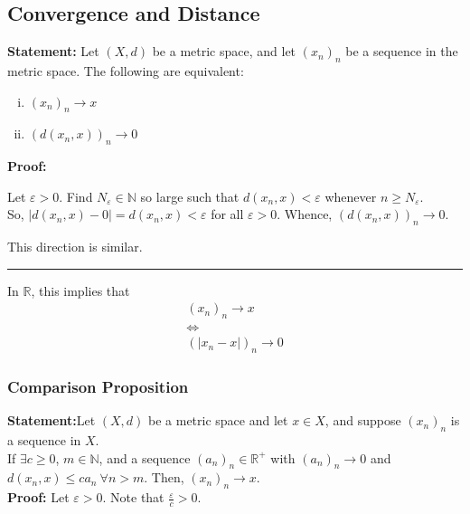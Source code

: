 \documentclass[10pt]{extarticle}
\newcommand{\N}{\mathbb{N}}
\newcommand{\R}{\mathbb{R}}
\begin{document}
    \subsection{Convergence and Distance}%
    \textbf{Statement:} Let $(X,d)$ be a metric space, and let $(x_n)_n$ be a sequence in the metric space. The following are equivalent:
      \begin{enumerate}[(i)]
        \item $(x_n)_n\rightarrow x$
        \item $\left(d(x_n,x)\right)_n \rightarrow 0$
      \end{enumerate}
      \textbf{Proof:}
      \begin{description}[font=\normalfont]
        \item[(i) $\Rightarrow$ (b)] Let $\varepsilon > 0$. Find $N_{\varepsilon}\in\N$ so large such that $d(x_n,x) < \varepsilon$ whenever $n \geq N_{\varepsilon}$.\\

          So, $|d(x_n,x)-0| = d(x_n,x) < \varepsilon$ for all $\varepsilon > 0$. Whence, $\left(d(x_n,x)\right)_n \rightarrow 0$.
        \item[(ii) $\Rightarrow$ (i)] This direction is similar.
      \end{description}
      \begin{center}
        \rule{0.5\textwidth}{0.4pt}
      \end{center}
    In $\R$, this implies that
    \begin{align*}
      (x_n)_n \rightarrow x\\
      \Leftrightarrow\\
      (|x_n -x|)_n \rightarrow 0
    \end{align*}
  \subsubsection{Comparison Proposition}%
  \textbf{Statement:}Let $(X,d)$ be a metric space and let $x\in X$, and suppose $(x_n)_n$ is a sequence in $X$.\\

    If $\exists c\geq 0$, $m\in\N$, and a sequence $(a_n)_n\in\R^+$ with $(a_n)_n \rightarrow 0$ and $d(x_n,x) \leq c a_n~\forall n > m$. Then, $(x_n)_n\rightarrow x$.\\
    
    \textbf{Proof:} Let $\varepsilon > 0$. Note that $\frac{\varepsilon}{c} > 0$.\\
\end{document}
